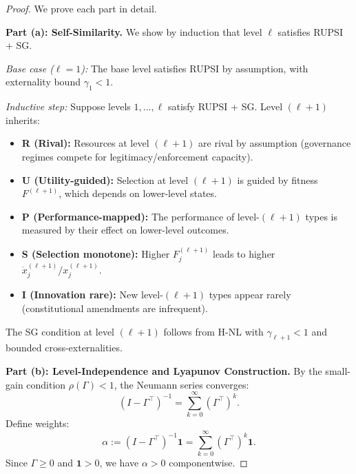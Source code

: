 \documentclass[12pt]{article}
\begin{document}
\begin{proof}
We prove each part in detail.

\textbf{Part (a): Self-Similarity.}
We show by induction that level $\ell$ satisfies RUPSI + SG.

\textit{Base case ($\ell = 1$):} The base level satisfies RUPSI by assumption, with externality bound $\gamma_1 < 1$.

\textit{Inductive step:} Suppose levels $1, \ldots, \ell$ satisfy RUPSI + SG. Level $(\ell + 1)$ inherits:
\begin{itemize}
    \item \textbf{R (Rival):} Resources at level $(\ell + 1)$ are rival by assumption (governance regimes compete for legitimacy/enforcement capacity).
    \item \textbf{U (Utility-guided):} Selection at level $(\ell + 1)$ is guided by fitness $F^{(\ell+1)}$, which depends on lower-level states.
    \item \textbf{P (Performance-mapped):} The performance of level-$(\ell + 1)$ types is measured by their effect on lower-level outcomes.
    \item \textbf{S (Selection monotone):} Higher $F^{(\ell+1)}_j$ leads to higher $\dot{x}^{(\ell+1)}_j / x^{(\ell+1)}_j$.
    \item \textbf{I (Innovation rare):} New level-$(\ell + 1)$ types appear rarely (constitutional amendments are infrequent).
\end{itemize}
The SG condition at level $(\ell + 1)$ follows from H-NL with $\gamma_{\ell+1} < 1$ and bounded cross-externalities.

\textbf{Part (b): Level-Independence and Lyapunov Construction.}
By the small-gain condition $\rho(\Gamma) < 1$, the Neumann series converges:
\[
(I - \Gamma^\top)^{-1} = \sum_{k=0}^\infty (\Gamma^\top)^k.
\]
Define weights:
\[
\alpha := (I - \Gamma^\top)^{-1} \mathbf{1} = \sum_{k=0}^\infty (\Gamma^\top)^k \mathbf{1}.
\]
Since $\Gamma \geq 0$ and $\mathbf{1} > 0$, we have $\alpha > 0$ componentwise.


\end{proof}
\end{document}

